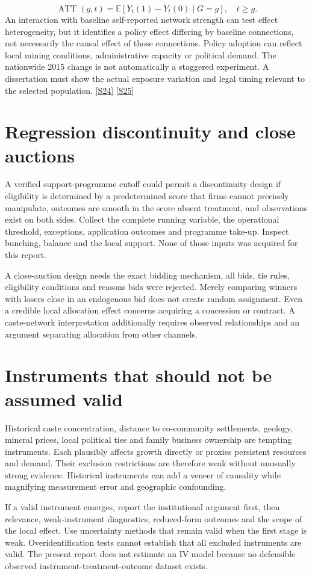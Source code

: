 \documentclass[11pt,a4paper]{report}
\begin{document}
\[
\operatorname{ATT}(g,t)=
\mathbb{E}[Y_t(1)-Y_t(0)\mid G=g],\quad t\geq g.
\]
An interaction with baseline self-reported network strength can test effect heterogeneity, but it identifies a policy effect differing by baseline connections, not necessarily the causal effect of those connections. Policy adoption can reflect local mining conditions, administrative capacity or political demand. The nationwide 2015 change is not automatically a staggered experiment. A dissertation must show the actual exposure variation and legal timing relevant to the selected population. \hyperlink{S24}{[S24]} \hyperlink{S25}{[S25]}

\section{Regression discontinuity and close auctions}
A verified support-programme cutoff could permit a discontinuity design if eligibility is determined by a predetermined score that firms cannot precisely manipulate, outcomes are smooth in the score absent treatment, and observations exist on both sides. Collect the complete running variable, the operational threshold, exceptions, application outcomes and programme take-up. Inspect bunching, balance and the local support. None of those inputs was acquired for this report.

A close-auction design needs the exact bidding mechanism, all bids, tie rules, eligibility conditions and reasons bids were rejected. Merely comparing winners with losers close in an endogenous bid does not create random assignment. Even a credible local allocation effect concerns acquiring a concession or contract. A caste-network interpretation additionally requires observed relationships and an argument separating allocation from other channels.

\section{Instruments that should not be assumed valid}
Historical caste concentration, distance to co-community settlements, geology, mineral prices, local political ties and family business ownership are tempting instruments. Each plausibly affects growth directly or proxies persistent resources and demand. Their exclusion restrictions are therefore weak without unusually strong evidence. Historical instruments can add a veneer of causality while magnifying measurement error and geographic confounding.

If a valid instrument emerges, report the institutional argument first, then relevance, weak-instrument diagnostics, reduced-form outcomes and the scope of the local effect. Use uncertainty methods that remain valid when the first stage is weak. Overidentification tests cannot establish that all excluded instruments are valid. The present report does not estimate an IV model because no defensible observed instrument-treatment-outcome dataset exists.
\end{document}

